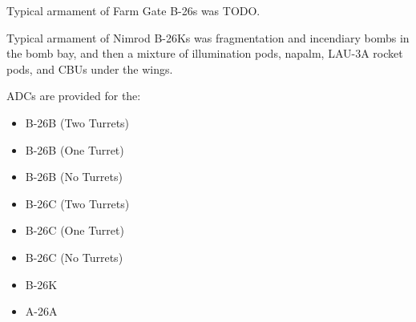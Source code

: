 Typical armament of Farm Gate B-26s was TODO.

Typical armament of Nimrod B-26Ks was fragmentation and incendiary bombs in the bomb bay, and then a mixture of illumination pods, napalm, LAU-3A rocket pods, and CBUs under the wings.

ADCs are provided for the:
\begin{itemize}
\item B-26B (Two Turrets)
\item B-26B (One Turret)
\item B-26B (No Turrets)
\item B-26C (Two Turrets)
\item B-26C (One Turret)
\item B-26C (No Turrets)
\item B-26K
\item A-26A
\end{itemize}
